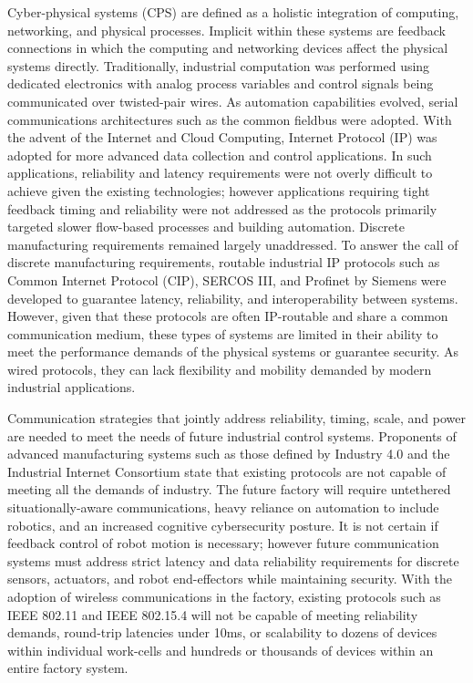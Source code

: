 Cyber-physical systems (CPS) are defined as a holistic integration of computing, networking, and physical processes.  Implicit within these systems are feedback connections in which the computing and networking devices affect the physical systems directly.  Traditionally, industrial computation was performed using dedicated electronics with analog process variables and control signals being communicated over twisted-pair wires.  As automation capabilities evolved, serial communications architectures such as the common fieldbus were adopted.  With the advent of the Internet and Cloud Computing, Internet Protocol (IP) was adopted for more advanced data collection and control applications.  In such applications, reliability and latency requirements were not overly difficult to achieve given the existing technologies; however applications requiring tight feedback timing and reliability were not addressed as the protocols primarily targeted slower flow-based processes and building automation.  Discrete manufacturing requirements remained largely unaddressed.  To answer the call of discrete manufacturing requirements, routable industrial IP protocols such as Common Internet Protocol (CIP), SERCOS III, and Profinet by Siemens were developed to guarantee latency, reliability, and interoperability between systems.  However, given that these protocols are often IP-routable and share a common communication medium, these types of systems are limited in their ability to meet the performance demands of the physical systems or guarantee security.   As wired protocols, they can lack flexibility and mobility demanded by modern industrial applications.

Communication strategies that jointly address reliability, timing, scale, and power are needed to meet the needs of future industrial control systems.  Proponents of advanced manufacturing systems such as those defined by Industry 4.0 and the Industrial Internet Consortium state that existing protocols are not capable of meeting all the demands of industry.  The future factory will require untethered situationally-aware communications, heavy reliance on automation to include robotics, and an increased cognitive cybersecurity posture.  It is not certain if feedback control of robot motion is necessary; however future communication systems must address strict latency and data reliability requirements for discrete sensors, actuators, and robot end-effectors while maintaining security.  With the adoption of wireless communications in the factory, existing protocols such as IEEE 802.11 and IEEE 802.15.4 will not be capable of meeting reliability demands, round-trip latencies under 10ms, or scalability to dozens of devices within individual work-cells and hundreds or thousands of devices within an entire factory system.   
 
